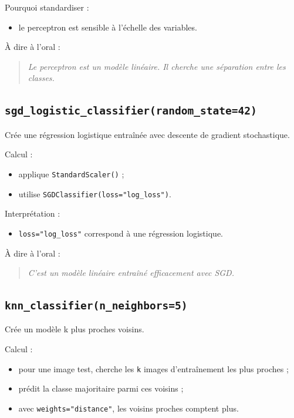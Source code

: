 \documentclass[11pt,a4paper]{article}
\begin{document}
Pourquoi standardiser :

\begin{itemize}
\item le perceptron est sensible à l'échelle des variables.
\end{itemize}

À dire à l'oral :

\begin{quote}
\itshape Le perceptron est un modèle linéaire. Il cherche une séparation entre les classes.
\end{quote}

\subsection{\texttt{sgd\_logistic\_classifier(random\_state=42)}}

Crée une régression logistique entraînée avec descente de gradient stochastique.

Calcul :

\begin{itemize}
\item applique \texttt{StandardScaler()} ;
\item utilise \texttt{SGDClassifier(loss="log\_loss")}.
\end{itemize}

Interprétation :

\begin{itemize}
\item \texttt{loss="log\_loss"} correspond à une régression logistique.
\end{itemize}

À dire à l'oral :

\begin{quote}
\itshape C'est un modèle linéaire entraîné efficacement avec SGD.
\end{quote}

\subsection{\texttt{knn\_classifier(n\_neighbors=5)}}

Crée un modèle k plus proches voisins.

Calcul :

\begin{itemize}
\item pour une image test, cherche les \texttt{k} images d'entraînement les plus proches ;
\item prédit la classe majoritaire parmi ces voisins ;
\item avec \texttt{weights="distance"}, les voisins proches comptent plus.
\end{itemize}
\end{document}
